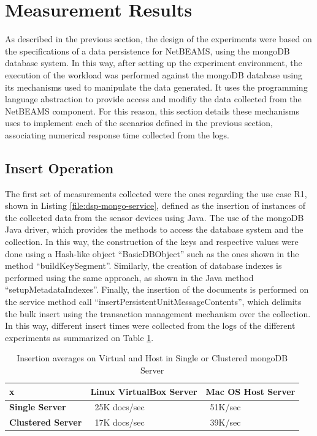 \section{Measurement Results}
\label{sec:exp-measurements}

As described in the previous section, the design of the experiments were based
on the specifications of a data persistence for NetBEAMS, using the mongoDB
database system. In this way, after setting up the experiment environment,
the execution of the workload was performed against the mongoDB database using
its mechanisms used to manipulate the data generated. It uses the programming
language abstraction to provide access and modifiy the data collected from the
NetBEAMS component. For this reason, this section details these mechanisms uses
to implement each of the scenarios defined in the previous section, associating
numerical response time collected from the logs.

\subsection{Insert Operation}

The first set of measurements collected were the ones regarding the use case
R1, shown in Listing \ref{file:dsp-mongo-service}, defined as the insertion of
instances of the collected data from the sensor devices using Java. The use of
the mongoDB Java driver, which provides the methods to access the database
system and the collection. In this way, the construction of the keys and
respective values were done using a Hash-like object ``BasicDBObject'' such as
the ones shown in the method ``buildKeySegment''. Similarly, the creation of
database indexes is performed using the same approach, as shown in the Java
method ``setupMetadataIndexes''. Finally, the insertion of the documents is
performed on the service method call ``insertPersistentUnitMessageContents'',
which delimits the bulk insert using the transaction management mechanism over
the collection. In this way, different insert times were collected from the
logs of the different experiments as summarized on Table
\ref{tab:experiment-insert-avarage}.

\begin{table}
    \begin{center}
        \begin{tabular}{|p{100pt}|p{100pt}|p{100pt}|}\hline
           x & \textbf{Linux VirtualBox Server} & \textbf{Mac OS Host Server}\\\hline 
           \textbf{Single Server} & ~25K docs/sec & ~51K/sec \\\hline
           \textbf{Clustered Server} & ~17K docs/sec & ~39K/sec \\\hline
        \end{tabular}
        \caption{Insertion averages on Virtual and Host in Single or Clustered
        mongoDB Server}
    \end{center}
    \label{tab:experiment-insert-avarage}
\end{table}

